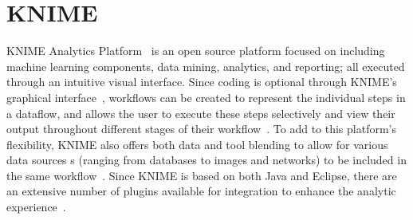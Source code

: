 \section{KNIME}

KNIME Analytics Platform~\cite{hid-sp18-504-pred-knime} is an open source 
platform focused on including machine learning components, data mining, 
analytics, and reporting; all executed through an intuitive visual interface. 
Since coding is optional through KNIME's graphical 
interface~\cite{hid-sp18-504-knime}, workflows can be created to represent the 
individual steps in a dataflow, and allows the user to execute these steps 
selectively and view their output throughout different stages of their 
workflow~\cite{hid-sp18-504-pred-knime}. To add to this platform's flexibility,
KNIME also offers both data and tool blending to allow for various data sources
s (ranging from databases to images and networks) to be included in the same
workflow~\cite{hid-sp18-504-knime}. Since KNIME is based on both Java 
and Eclipse, there are an extensive number of plugins available for 
integration to enhance the analytic experience~\cite{hid-sp18-504-pred-knime}.
